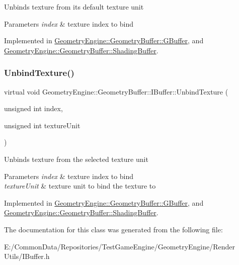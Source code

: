 Unbinds texture from its default texture unit 
\begin{DoxyParams}{Parameters}
{\em index} & texture index to bind \\
\hline
\end{DoxyParams}


Implemented in \mbox{\hyperlink{class_geometry_engine_1_1_geometry_buffer_1_1_g_buffer_a3034ecd5b07b64a0cb7af24f5c6f80ae}{Geometry\+Engine\+::\+Geometry\+Buffer\+::\+G\+Buffer}}, and \mbox{\hyperlink{class_geometry_engine_1_1_geometry_buffer_1_1_shading_buffer_a7c5594fbcc9e0cd43f4b6ebb8e9b9197}{Geometry\+Engine\+::\+Geometry\+Buffer\+::\+Shading\+Buffer}}.

\mbox{\label{class_geometry_engine_1_1_geometry_buffer_1_1_i_buffer_a1136bf19a08f111e08648e66a8518b09}} 
\subsubsection{\texorpdfstring{UnbindTexture()}{UnbindTexture()}\hspace{0.1cm}{\footnotesize\ttfamily [2/2]}}
{\footnotesize\ttfamily virtual void Geometry\+Engine\+::\+Geometry\+Buffer\+::\+I\+Buffer\+::\+Unbind\+Texture (\begin{DoxyParamCaption}\item[{unsigned int}]{index,  }\item[{unsigned int}]{texture\+Unit }\end{DoxyParamCaption})\hspace{0.3cm}{\ttfamily [pure virtual]}}

Unbinds texture from the selected texture unit 
\begin{DoxyParams}{Parameters}
{\em index} & texture index to bind \\
\hline
{\em texture\+Unit} & texture unit to bind the texture to \\
\hline
\end{DoxyParams}


Implemented in \mbox{\hyperlink{class_geometry_engine_1_1_geometry_buffer_1_1_g_buffer_a1f02674c4ff24debb9f4b1b6d1243a9b}{Geometry\+Engine\+::\+Geometry\+Buffer\+::\+G\+Buffer}}, and \mbox{\hyperlink{class_geometry_engine_1_1_geometry_buffer_1_1_shading_buffer_aa1731f2f7848509ac5c04fc417286454}{Geometry\+Engine\+::\+Geometry\+Buffer\+::\+Shading\+Buffer}}.



The documentation for this class was generated from the following file\+:\begin{DoxyCompactItemize}
\item 
E\+:/\+Common\+Data/\+Repositories/\+Test\+Game\+Engine/\+Geometry\+Engine/\+Render Utils/I\+Buffer.\+h\end{DoxyCompactItemize}
